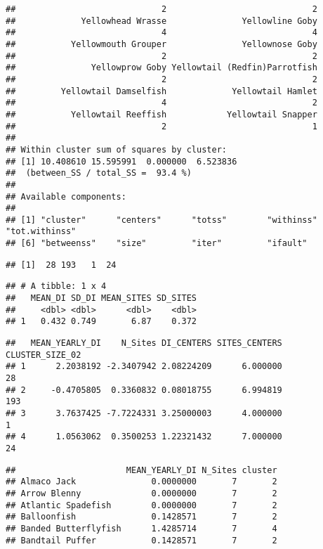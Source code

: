 \documentclass[
]{article}
\begin{document}
\begin{verbatim}
##                             2                             2 
##             Yellowhead Wrasse               Yellowline Goby 
##                             4                             4 
##           Yellowmouth Grouper               Yellownose Goby 
##                             2                             2 
##               Yellowprow Goby Yellowtail (Redfin)Parrotfish 
##                             2                             2 
##         Yellowtail Damselfish             Yellowtail Hamlet 
##                             4                             2 
##           Yellowtail Reeffish            Yellowtail Snapper 
##                             2                             1 
## 
## Within cluster sum of squares by cluster:
## [1] 10.408610 15.595991  0.000000  6.523836
##  (between_SS / total_SS =  93.4 %)
## 
## Available components:
## 
## [1] "cluster"      "centers"      "totss"        "withinss"     "tot.withinss"
## [6] "betweenss"    "size"         "iter"         "ifault"
\end{verbatim}

\begin{verbatim}
## [1]  28 193   1  24
\end{verbatim}

\begin{verbatim}
## # A tibble: 1 x 4
##   MEAN_DI SD_DI MEAN_SITES SD_SITES
##     <dbl> <dbl>      <dbl>    <dbl>
## 1   0.432 0.749       6.87    0.372
\end{verbatim}

\begin{verbatim}
##   MEAN_YEARLY_DI    N_Sites DI_CENTERS SITES_CENTERS CLUSTER_SIZE_02
## 1      2.2038192 -2.3407942 2.08224209      6.000000              28
## 2     -0.4705805  0.3360832 0.08018755      6.994819             193
## 3      3.7637425 -7.7224331 3.25000003      4.000000               1
## 4      1.0563062  0.3500253 1.22321432      7.000000              24
\end{verbatim}

\begin{verbatim}
##                      MEAN_YEARLY_DI N_Sites cluster
## Almaco Jack               0.0000000       7       2
## Arrow Blenny              0.0000000       7       2
## Atlantic Spadefish        0.0000000       7       2
## Balloonfish               0.1428571       7       2
## Banded Butterflyfish      1.4285714       7       4
## Bandtail Puffer           0.1428571       7       2
\end{verbatim}
\end{document}
